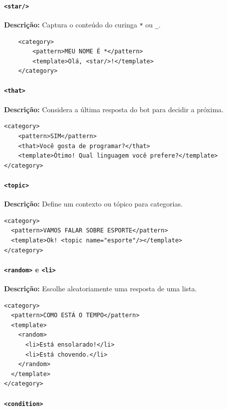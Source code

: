 \documentclass[14pt,a4paper,oneside]{book}
\begin{document}
\paragraph{\texttt{<star/>}} 

\textbf{Descrição:} Captura o conteúdo do curinga \texttt{*} ou \texttt{\_}. 

\begin{lstlisting}
	<category>
		<pattern>MEU NOME É *</pattern>
		<template>Olá, <star/>!</template>
	</category>
\end{lstlisting}

\paragraph{\texttt{<that>}} 

\textbf{Descrição:} Considera a última resposta do bot para decidir a próxima. 

\begin{lstlisting}
<category>
	<pattern>SIM</pattern>
	<that>Você gosta de programar?</that>
	<template>Ótimo! Qual linguagem você prefere?</template>
</category>
\end{lstlisting}

\paragraph{\texttt{<topic>}} 

\textbf{Descrição:} Define um contexto ou tópico para categorias. 

\begin{lstlisting}
<category>
  <pattern>VAMOS FALAR SOBRE ESPORTE</pattern>
  <template>Ok! <topic name="esporte"/></template>
</category>
\end{lstlisting}

\paragraph{\texttt{<random>} e \texttt{<li>}} 

\textbf{Descrição:} Escolhe aleatoriamente uma resposta de uma lista. 

\begin{lstlisting}
<category>
  <pattern>COMO ESTÁ O TEMPO</pattern>
  <template>
    <random>
      <li>Está ensolarado!</li>
      <li>Está chovendo.</li>
    </random>
  </template>
</category>
\end{lstlisting}

\paragraph{\texttt{<condition>}} 
\end{document}
